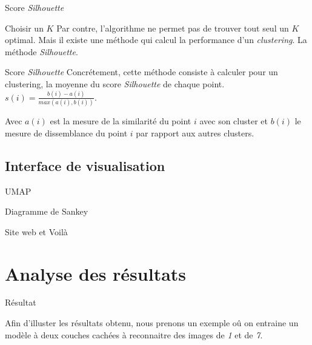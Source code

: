 \documentclass[10pt,handout]{beamer}
\begin{document}
\begin{frame}{Score \textit{Silhouette}}
    \begin{block}{Choisir un $K$}
        Par contre, l'algorithme ne permet pas de trouver tout seul un $K$ optimal. Mais il existe une méthode qui calcul la performance d'un \textit{clustering}. La méthode \textit{Silhouette}.
    \end{block}
    \begin{block}{Score \textit{Silhouette}}
        Concrétement, cette méthode consiste à calculer pour un clustering, la moyenne du score \textit{Silhouette} de chaque point. $ s(i) = \frac{b(i) - a(i)}{max(a(i), b(i))} $.

        Avec $a(i)$ est la mesure de la similarité du point $i$ avec son cluster et $b(i)$ le mesure de dissemblance du point $i$ par rapport aux autres clusters.
    \end{block}
\end{frame}

\begin{frame}
\end{frame}

\subsection{Interface de visualisation}
\begin{frame}{UMAP}
    
\end{frame}

\begin{frame}{Diagramme de Sankey}
    
\end{frame}

\begin{frame}{Site web et Voilà}
    
\end{frame}

\section{Analyse des résultats}
\begin{frame}{Résultat}
    \begin{block}{}
        Afin d'illuster les résultats obtenu, nous prenons un exemple oû on entraine un modèle à deux couches cachées à reconnaitre des images de \textit{1} et de \textit{7}.
    \end{block}
\end{frame}
\end{document}

